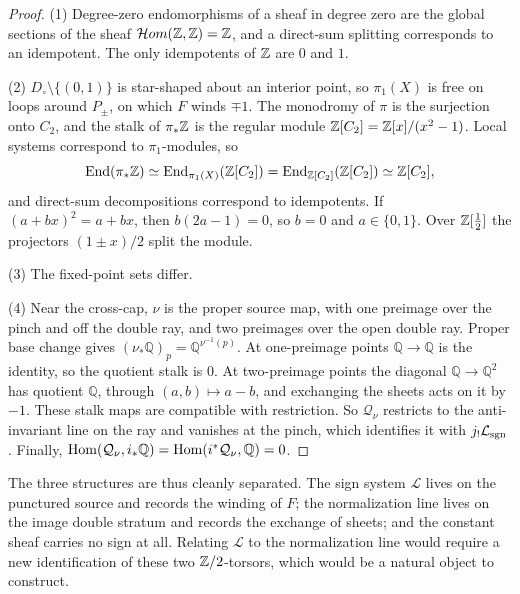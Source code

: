 \documentclass[11pt]{article}
\theoremstyle{definition}\newtheorem{definition}[theorem]{Definition}
\theoremstyle{remark}\newtheorem{remark}[theorem]{Remark}
\newcommand{\Q}{\mathbb Q}\newcommand{\T}{\mathbb T}
\begin{document}
\begin{proof}
(1) Degree-zero endomorphisms of a sheaf in degree zero are the global sections
of the sheaf $\mathcal{H}om(\mathbb Z,\mathbb Z)=\mathbb Z$, and a direct-sum splitting corresponds
to an idempotent. The only idempotents of $\mathbb Z$ are $0$ and $1$.

(2) $D_\circ\setminus\{(0,1)\}$ is star-shaped about an interior point, so
$\pi_1(X)$ is free on loops around $P_\pm$, on which $F$ winds $\mp1$. The
monodromy of $\pi$ is the surjection onto $C_2$, and the stalk of $\pi_*\mathbb Z$ is
the regular module $\mathbb Z[C_2]=\mathbb Z[x]/(x^2-1)$. Local systems correspond to
$\pi_1$-modules, so
\[
 \operatorname{End}(\pi_*\mathbb Z)\simeq\operatorname{End}_{\pi_1(X)}(\mathbb Z[C_2])=\operatorname{End}_{\mathbb Z[C_2]}(\mathbb Z[C_2])\simeq\mathbb Z[C_2],
\]
and direct-sum decompositions correspond to idempotents. If $(a+bx)^2=a+bx$,
then $b(2a-1)=0$, so $b=0$ and $a\in\{0,1\}$. Over $\mathbb Z[\frac12]$ the projectors
$(1\pm x)/2$ split the module.

(3) The fixed-point sets differ.

(4) Near the cross-cap, $\nu$ is the proper source map, with one preimage over
the pinch and off the double ray, and two preimages over the open double ray.
Proper base change gives $(\nu_*\Q)_p=\Q^{\nu^{-1}(p)}$. At one-preimage points
$\Q\to\Q$ is the identity, so the quotient stalk is $0$. At two-preimage points
the diagonal $\Q\to\Q^2$ has quotient $\Q$, through $(a,b)\mapsto a-b$, and
exchanging the sheets acts on it by $-1$. These stalk maps are compatible with
restriction. So $\mathcal Q_\nu$ restricts to the anti-invariant line on the
ray and vanishes at the pinch, which identifies it with $j_!\mathcal L_{\rm sgn}$
\cite{stacks}. Finally, $\Hom(\mathcal Q_\nu,i_*\Q)=\Hom(i^*\mathcal Q_\nu,\Q)=0$.
\end{proof}
The three structures are thus cleanly separated. The sign system $\mathcal L$
lives on the punctured source and records the winding of $F$; the normalization
line lives on the image double stratum and records the exchange of sheets; and
the constant sheaf carries no sign at all. Relating $\mathcal L$ to the
normalization line would require a new identification of these two
$\mathbb Z/2$-torsors, which would be a natural object to construct.
\end{document}
